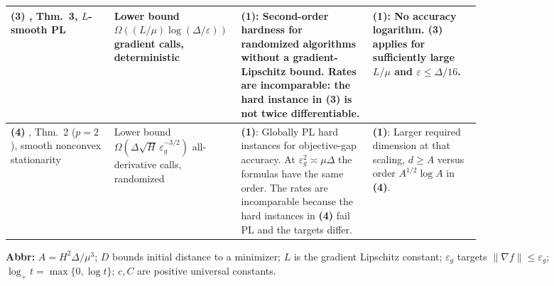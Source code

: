 \begin{table}[tp]
\begin{threeparttable}
\begin{tabularx}{\linewidth}{@{}>{\raggedright\arraybackslash}p{0.22\linewidth}>{\raggedright\arraybackslash}p{0.27\linewidth}>{\raggedright\arraybackslash}p{0.28\linewidth}>{\raggedright\arraybackslash}X@{}}
\midrule
\textbf{(3)} \citep{smoothPLYue2023v2}, Thm.~3, $L$-smooth PL & Lower bound $\Omega((L/\mu)\log(\Delta/\varepsilon))$ gradient calls, deterministic & \textbf{(1)}: Second-order hardness for randomized algorithms without a gradient-Lipschitz bound. Rates are incomparable: the hard instance in \textbf{(3)} is not twice differentiable. & \textbf{(1)}: No accuracy logarithm. \textbf{(3)} applies for sufficiently large $L/\mu$ and $\varepsilon\leq\Delta/16$. \\
\midrule
\textbf{(4)} \citep{sncCarmon2020v3}, Thm.~2 ($p=2$), smooth nonconvex stationarity & Lower bound $\Omega(\Delta\sqrt H\,\varepsilon_g^{-3/2})$ all-derivative calls, randomized & \textbf{(1)}: Globally PL hard instances for objective-gap accuracy. At $\varepsilon_g^2\asymp\mu\Delta$ the formulas have the same order. The rates are incomparable because the hard instances in \textbf{(4)} fail PL and the targets differ. & \textbf{(1)}: Larger required dimension at that scaling, $d\geq A$ versus order $A^{1/2}\log A$ in \textbf{(4)}. \\
\bottomrule
\end{tabularx}
\begin{tablenotes}[flushleft]\footnotesize
\item[] \textbf{Abbr:} $A=H^2\Delta/\mu^3$; $D$ bounds initial distance to a minimizer; $L$ is the gradient Lipschitz constant; $\varepsilon_g$ targets $\|\nabla f\|\leq\varepsilon_g$; $\log_+ t=\max\{0,\log t\}$; $c,C$ are positive universal constants.
\end{tablenotes}
\end{threeparttable}
\end{table}
